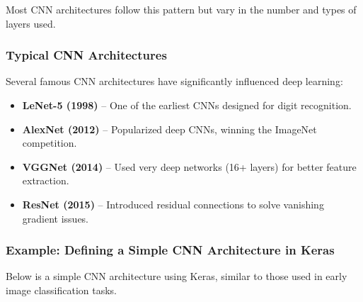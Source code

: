 \documentclass[
  letterpaper,
  DIV=11,
  numbers=noendperiod]{scrreprt}
\providecommand{\tightlist}{%
  \setlength{\itemsep}{0pt}\setlength{\parskip}{0pt}}\usepackage{longtable,booktabs,array}
\begin{document}
Most CNN architectures follow this pattern but vary in the number and
types of layers used.

\subsubsection{Typical CNN
Architectures}\label{typical-cnn-architectures}

Several famous CNN architectures have significantly influenced deep
learning:

\begin{itemize}
\tightlist
\item
  \textbf{LeNet-5 (1998)} -- One of the earliest CNNs designed for digit
  recognition.
\item
  \textbf{AlexNet (2012)} -- Popularized deep CNNs, winning the ImageNet
  competition.
\item
  \textbf{VGGNet (2014)} -- Used very deep networks (16+ layers) for
  better feature extraction.
\item
  \textbf{ResNet (2015)} -- Introduced residual connections to solve
  vanishing gradient issues.
\end{itemize}

\subsubsection{Example: Defining a Simple CNN Architecture in
Keras}\label{example-defining-a-simple-cnn-architecture-in-keras}

Below is a simple CNN architecture using Keras, similar to those used in
early image classification tasks.
\end{document}
